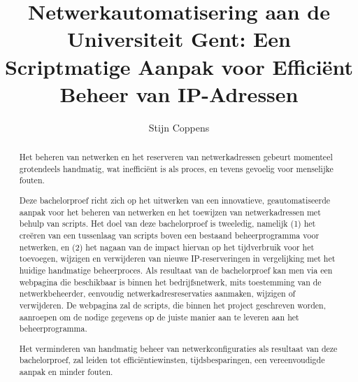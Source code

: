 \documentclass{hogent-article}
\title{Netwerkautomatisering aan de Universiteit Gent: Een Scriptmatige Aanpak voor Efficiënt Beheer van IP-Adressen}
\author{Stijn Coppens}
\begin{document}
\begin{abstract}
Het beheren van netwerken en het reserveren van netwerkadressen gebeurt momenteel grotendeels handmatig, wat inefficiënt is als proces, en tevens gevoelig voor menselijke fouten. 

Deze bachelorproef richt zich op het uitwerken van een innovatieve, geautomatiseerde aanpak voor het beheren van netwerken en het
toewijzen van netwerkadressen met behulp van scripts. 
Het doel van deze bachelorproef is tweeledig, namelijk (1) het creëren van een tussenlaag van scripts boven een bestaand beheerprogramma voor netwerken, en (2) het nagaan van de impact hiervan op het tijdverbruik voor het toevoegen, wijzigen en verwijderen van nieuwe IP-reserveringen in vergelijking met het huidige handmatige beheerproces. Als resultaat van de bachelorproef kan men via een webpagina die beschikbaar is binnen het bedrijfsnetwerk, mits toestemming van de netwerkbeheerder, eenvoudig netwerkadresreservaties aanmaken, wijzigen of verwijderen.
De webpagina zal de scripts, die binnen het project geschreven worden, aanroepen om de nodige gegevens op de juiste manier aan te leveren aan het beheerprogramma. 

Het verminderen van handmatig beheer van netwerkconfiguraties als resultaat van deze bachelorproef, zal leiden tot efficiëntiewinsten, tijdsbesparingen, een vereenvoudigde aanpak en minder fouten. 


\end{abstract}
\tableofcontents
\end{document}
